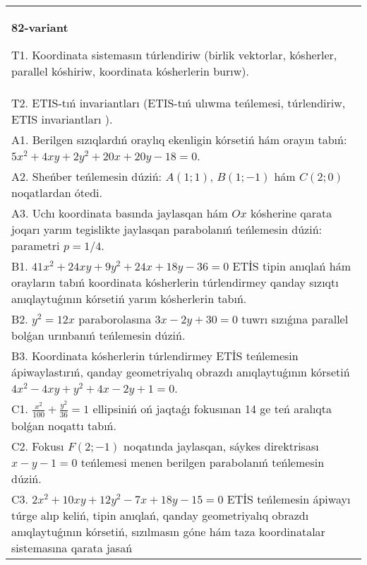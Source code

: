 \documentclass{article}
\begin{document}
\begin{tabular}{m{17cm}}
\textbf{82-variant}
\newline

T1. Koordinata sistemasın túrlendiriw (birlik vektorlar, kósherler, parallel kóshiriw, koordinata kósherlerin burıw).\\

T2. ETIS-tıń invariantları (ETIS-tıń ulıwma teńlemesi, túrlendiriw, ETIS invariantları ).\\

A1. Berilgen sızıqlardıń oraylıq ekenligin kórsetiń hám orayın tabıń: $5 x^{2}+4 xy+2 y^{2}+20 x+20 y-18=0$.\\

A2. Sheńber teńlemesin dúziń: $A (1;1) $, $B (1;-1) $ hám $C (2;0) $ noqatlardan ótedi.\\

A3. Uchı koordinata basında jaylasqan hám $Ox$ kósherine qarata joqarı yarım tegislikte jaylasqan parabolanıń teńlemesin dúziń: parametri $p=1/4$.\\

B1. $41x^{2} + 24xy + 9y^{2} + 24x + 18y - 36 = 0$ ETİS tipin anıqlań hám orayların tabıń koordinata kósherlerin túrlendirmey qanday sızıqtı anıqlaytuǵının kórsetiń yarım kósherlerin tabıń.  \\

B2. $y^{2} = 12x$ paraborolasına $3x - 2y + 30 = 0$ tuwrı sızıǵına parallel bolǵan urınbanıń teńlemesin dúziń.  \\

B3. Koordinata kósherlerin túrlendirmey ETİS teńlemesin ápiwaylastırıń, qanday geometriyalıq obrazdı anıqlaytuǵının kórsetiń $4x^{2} - 4xy + y^{2} + 4x - 2y + 1 = 0$.  \\

C1. $\frac{x^{2}}{100} + \frac{y^{2}}{36} = 1$ ellipsiniń oń jaqtaǵı fokusınan 14 ge teń aralıqta bolǵan noqattı tabıń.  \\

C2. Fokusı $F(2; - 1)$ noqatında jaylasqan, sáykes direktrisası $x - y - 1 = 0$ teńlemesi menen berilgen parabolanıń teńlemesin dúziń.  \\

C3. $2x^{2} + 10xy + 12y^{2} - 7x + 18y - 15 = 0$ ETİS teńlemesin ápiwayı túrge alıp keliń, tipin anıqlań, qanday geometriyalıq obrazdı anıqlaytuǵının kórsetiń, sızılmasın góne hám taza koordinatalar sistemasına qarata jasań  \\

\end{tabular}
\vspace{1cm}
\end{document}
